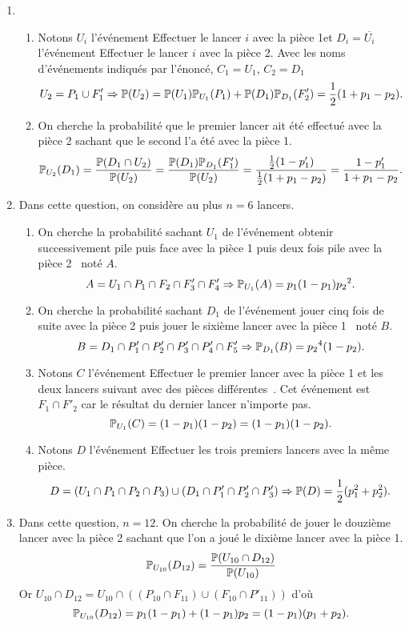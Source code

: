 \begin{enumerate}
 \item
 \begin{enumerate}
  \item Notons $U_i$ l'événement \og Effectuer le lancer $i$ avec la pièce 1\fg et $D_i = \overline{U_i}$ l'événement \og Effectuer le lancer $i$ avec la pièce 2\fg. Avec les noms d'événements indiqués par l'énoncé, $C_1 = U_1$, $C_2 = D_1$
  \[
   U_2 = P_1 \cup F'_1 
   \Rightarrow 
   \mathbb{P}(U_2) = \mathbb{P}(U_1)\mathbb{P}_{U_1}(P_1) + \mathbb{P}(D_1)\mathbb{P}_{D_1}(F_2') = \frac{1}{2}(1 + p_1 -p_2).
  \]

  \item On cherche la probabilité que le premier lancer ait été effectué avec la pièce 2 sachant que le second l'a été avec la pièce 1.
  \[
   \mathbb{P}_{U_2}(D_1) = \frac{\mathbb{P}(D_1 \cap U_2)}{\mathbb{P}(U_2)}
   = \frac{\mathbb{P}(D_1)\mathbb{P}_{D_1}(F'_1)}{\mathbb{P}(U_2)}
   = \frac{\frac{1}{2}(1-p'_1)}{\frac{1}{2}(1 + p_1 -p_2)}
   = \frac{1-p'_1}{1 + p_1 -p_2}.
  \]
 \end{enumerate}
 
 \item Dans cette question, on considère au plus $n=6$ lancers.
 \begin{enumerate}
 \item On cherche la probabilité sachant $U_1$ de l'événement \og obtenir successivement pile puis face avec la pièce 1 puis deux fois pile avec la pièce 2\fg~ noté $A$.
 \[
  A = U_1\cap P_1 \cap F_2 \cap F'_3 \cap F'_4 
  \Rightarrow \mathbb{P}_{U_1}(A) = p_1(1-p_1){p_2}^2.
 \]

 \item On cherche la probabilité sachant $D_1$ de l'événement \og jouer cinq fois de suite avec la pièce 2 puis jouer le sixième lancer avec la pièce 1\fg~ noté $B$.
 \[
  B = D_1 \cap P'_1 \cap P'_2 \cap P'_3 \cap P'_4 \cap F'_5
  \Rightarrow \mathbb{P}_{D_1}(B) = {p_2}^4(1-p_2).
 \]

 \item Notons $C$ l'événement \og Effectuer le premier lancer avec la pièce 1 et les deux lancers suivant avec des pièces différentes\fg~. Cet événement est $F_1 \cap F'_2$ car le résultat du dernier lancer n'importe pas.
 \[
  \mathbb{P}_{U_1}(C) = (1-p_1)(1-p_2) = (1-p_1) (1-p_2).
 \]

 \item Notons $D$ l'événement \og Effectuer les trois premiers lancers avec la même pièce\fg.
 \[
  D = (U_1\cap P_1 \cap P_2 \cap P_3) \cup (D_1\cap P'_1 \cap P'_2 \cap P'_3)
  \Rightarrow
  \mathbb{P}(D) = \frac{1}{2}(p_1^2 + p_2^2).
 \]
\end{enumerate}

 \item Dans cette question, $n=12$. On cherche la probabilité de jouer le douzième lancer avec la pièce 2 sachant que l'on a joué le dixième lancer avec la pièce 1.
 \[
  \mathbb{P}_{U_{10}}(D_{12}) = \frac{\mathbb{P}(U_{10} \cap D_{12})}{\mathbb{P}(U_{10})}
 \]
Or $U_{10} \cap D_{12} = U_{10} \cap \left( (P_{10}\cap F_{11}) \cup (F_{10}\cap P'_{11}) \right)$ d'où
\[
 \mathbb{P}_{U_{10}}(D_{12}) = p_1(1-p_1) + (1-p_1)p_2 = (1-p_1)(p_1 + p_2).
\]
\end{enumerate}
